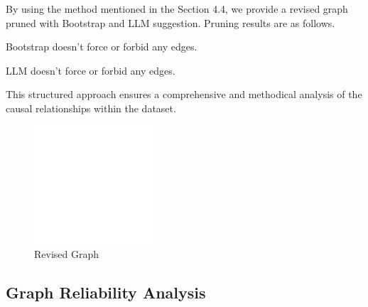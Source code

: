 \documentclass{article}
\begin{document}
\begin{minipage}[t]{0.6\linewidth}
    By using the method mentioned in the Section 4.4, we provide a revised graph pruned with Bootstrap and LLM suggestion. Pruning results are as follows.
        
    Bootstrap doesn't force or forbid any edges.
            
    LLM doesn't force or forbid any edges.
            
    This structured approach ensures a comprehensive and methodical analysis of the causal relationships within the dataset.
        
\vfill
\end{minipage}
\hfill
\begin{minipage}[t]{0.4\linewidth}
    \begin{figure}[H]
        \centering
        \vspace{-0.5cm}
        \includegraphics[width=\linewidth]{./demo_data/20241104_155051/Linear_Gaussian_data/output_graph/revised_graph.pdf}
        \caption{\label{fig:corr}Revised Graph}
    \end{figure}
\end{minipage}

\subsection{Graph Reliability Analysis}
\end{document}
